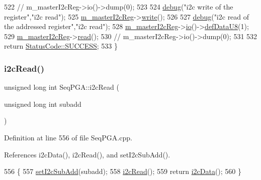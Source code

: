 \begin{DoxyCode}
522   \textcolor{comment}{//  m\_masterI2cReg->io()->dump(0);}
523 
524   \hyperlink{classObject_aac010553f022165573714b7014a15f0d}{debug}(\textcolor{stringliteral}{"i2c write of the register"},\textcolor{stringliteral}{"i2c read"});
525   \hyperlink{classSeqPGA_a942c71b33a4f43b7a994cb9216abb17e}{m\_masterI2cReg}->\hyperlink{classIOobject_a9f6984bc9f0fadcf800f1be2523ac744}{write}();
526 
527   \hyperlink{classObject_aac010553f022165573714b7014a15f0d}{debug}(\textcolor{stringliteral}{"i2c read of the addressed register"},\textcolor{stringliteral}{"i2c read"});
528   \hyperlink{classSeqPGA_a942c71b33a4f43b7a994cb9216abb17e}{m\_masterI2cReg}->\hyperlink{classIOobject_af04fb94137c3d86849f478ac5afab5d1}{io}()->\hyperlink{classIOdata_a80bb230b61062b447db5832e43bf7b44}{defDataU8}(1);
529   \hyperlink{classSeqPGA_a942c71b33a4f43b7a994cb9216abb17e}{m\_masterI2cReg}->\hyperlink{classIOobject_aa07610c11963b1db6710e3c76ceea456}{read}();
530   \textcolor{comment}{//  m\_masterI2cReg->io()->dump(0);}
531 
532   \textcolor{keywordflow}{return} \hyperlink{classStatusCode_a6f565cbeadc76d14c72f047e5e85eb4badd0da38d3ba0d922efd1f4619bc37ad8}{StatusCode::SUCCESS};
533 \}
\end{DoxyCode}
\mbox{\label{classSeqPGA_a9cf54d57d77b04f54cc0fe516c3528b4}} 
\subsubsection{\texorpdfstring{i2c\+Read()}{i2cRead()}\hspace{0.1cm}{\footnotesize\ttfamily [2/2]}}
{\footnotesize\ttfamily unsigned long int Seq\+P\+G\+A\+::i2c\+Read (\begin{DoxyParamCaption}\item[{unsigned long int}]{subadd }\end{DoxyParamCaption})}



Definition at line 556 of file Seq\+P\+G\+A.\+cpp.



References i2c\+Data(), i2c\+Read(), and set\+I2c\+Sub\+Add().


\begin{DoxyCode}
556                                                          \{
557   \hyperlink{classSeqPGA_a348c5d982223fb5cf2878e5bf3c6429c}{setI2cSubAdd}(subadd);
558   \hyperlink{classSeqPGA_a7cd344df2be99f3a02b487f80e87b27e}{i2cRead}();
559   \textcolor{keywordflow}{return} \hyperlink{classSeqPGA_a5e48f7b7ca1ada5a1decc0436dda4b26}{i2cData}();
560 \}
\end{DoxyCode}
\mbox{\label{classSeqPGA_a6c7137f9b45a20ecfcccf1d47e5af985}} 
